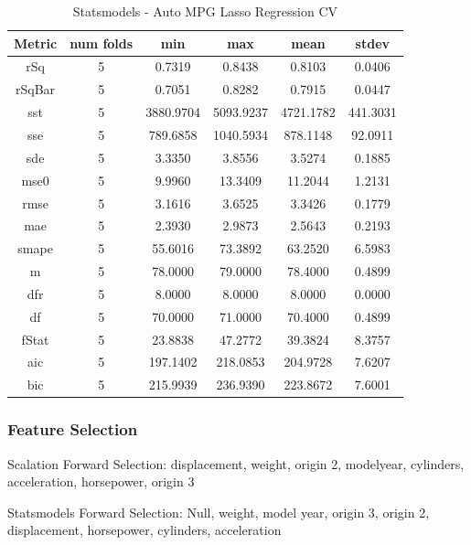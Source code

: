 \documentclass{article}
\begin{document}
\begin{table}[H]
\centering
\caption{Statsmodels - Auto MPG Lasso Regression CV}
\label{tab:Statsmodels - Auto MPG Lasso Regression CV}
\begin{tabular}{|c|c|c|c|c|c|}\hline
Metric & num folds & min & max & mean & stdev \\ \hline \hline
rSq & 5 & 0.7319 & 0.8438 & 0.8103 & 0.0406 \\ \hline
rSqBar & 5 & 0.7051 & 0.8282 & 0.7915 & 0.0447 \\ \hline
sst & 5 & 3880.9704 & 5093.9237 & 4721.1782 & 441.3031 \\ \hline
sse & 5 & 789.6858 & 1040.5934 & 878.1148 & 92.0911 \\ \hline
sde & 5 & 3.3350 & 3.8556 & 3.5274 & 0.1885 \\ \hline
mse0 & 5 & 9.9960 & 13.3409 & 11.2044 & 1.2131 \\ \hline
rmse & 5 & 3.1616 & 3.6525 & 3.3426 & 0.1779 \\ \hline
mae & 5 & 2.3930 & 2.9873 & 2.5643 & 0.2193 \\ \hline
smape & 5 & 55.6016 & 73.3892 & 63.2520 & 6.5983 \\ \hline
m & 5 & 78.0000 & 79.0000 & 78.4000 & 0.4899 \\ \hline
dfr & 5 & 8.0000 & 8.0000 & 8.0000 & 0.0000 \\ \hline
df & 5 & 70.0000 & 71.0000 & 70.4000 & 0.4899 \\ \hline
fStat & 5 & 23.8838 & 47.2772 & 39.3824 & 8.3757 \\ \hline
aic & 5 & 197.1402 & 218.0853 & 204.9728 & 7.6207 \\ \hline
bic & 5 & 215.9939 & 236.9390 & 223.8672 & 7.6001 \\ \hline
\end{tabular}
\end{table}

\subsubsection{Feature Selection}

Scalation Forward Selection: displacement, weight, origin 2, modelyear, cylinders, acceleration, horsepower, origin 3

Statsmodels Forward Selection: Null, weight, model year, origin 3, origin 2, displacement, horsepower, cylinders, acceleration
\end{document}
